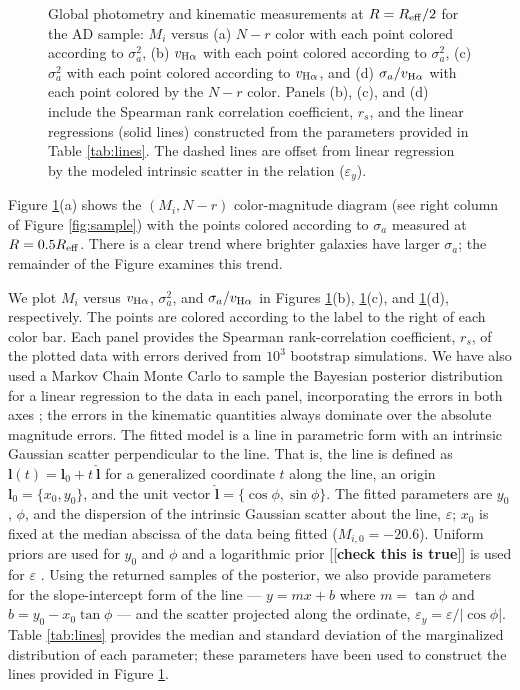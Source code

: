 \documentclass[apj,iop,revtex4,numberedappendix]{emulateapj}
\newcommand{\comment}[2][todo]{{\color{#1}[[{\bf #2}]]}}
\begin{document}
\begin{figure}
\begin{center}
%
\end{center}
%
\caption{
%
Global photometry and kinematic measurements at $R=R_{\rm eff}/2$ for
the AD sample: $M_i$ versus (a) $N-r$ color with each point colored
according to $\sigma_a^2$, (b) $v_{{\rm H}\alpha}$ with each point
colored according to $\sigma_a^2$, (c) $\sigma_a^2$ with each point
colored according to $v_{{\rm H}\alpha}$, and (d) $\sigma_a/v_{{\rm
H}\alpha}$ with each point colored by the $N-r$ color.  Panels (b), (c),
and (d) include the Spearman rank correlation coefficient, $r_s$, and
the linear regressions (solid lines) constructed from the parameters
provided in Table \ref{tab:lines}.  The dashed lines are offset from
linear regression by the modeled intrinsic scatter in the relation
($\varepsilon_y$).
%
}
%
\label{fig:correlation}
%
\end{figure}

Figure \ref{fig:correlation}(a) shows the $(M_i, N-r)$ color-magnitude
diagram (see right column of Figure \ref{fig:sample}) with the points
colored according to $\sigma_a$ measured at $R=0.5R_{\rm eff}$.  There
is a clear trend where brighter galaxies have larger $\sigma_a$; the
remainder of the Figure examines this trend.

We plot $M_i$ versus $v_{{\rm H}\alpha}$, $\sigma_a^2$, and
$\sigma_a/v_{{\rm H}\alpha}$ in Figures \ref{fig:correlation}(b),
\ref{fig:correlation}(c), and \ref{fig:correlation}(d), respectively.
The points are colored according to the label to the right of each color
bar.  Each panel provides the Spearman rank-correlation coefficient,
$r_s$, of the plotted data with errors derived from $10^3$ bootstrap
simulations.  We have also used a Markov Chain Monte Carlo to sample the
Bayesian posterior distribution for a linear regression to the data in
each panel, incorporating the errors in both axes \citep[see,
e.g.][]{2010arXiv1008.4686H}; the errors in the kinematic quantities
always dominate over the absolute magnitude errors.  The fitted model is
a line in parametric form with an intrinsic Gaussian scatter
perpendicular to the line.  That is, the line is defined as
$\mathbf{l}(t) = \mathbf{l}_0 + t\ \hat{\mathbf{l}}$ for a generalized
coordinate $t$ along the line, an origin $\mathbf{l}_0 = \{x_0, y_0\}$,
and the unit vector $\hat{\mathbf{l}} = \{\cos\phi, \sin\phi\}$.  The
fitted parameters are $y_0$, $\phi$, and the dispersion of the intrinsic
Gaussian scatter about the line, $\varepsilon$; $x_0$ is fixed at the
median abscissa of the data being fitted ($M_{i,0} = -20.6$).  Uniform
priors are used for $y_0$ and $\phi$ and a logarithmic prior
\comment{check this is true} is used for $\varepsilon$
\citep{MacKay:itp}.  Using the returned samples of the posterior, we
also provide parameters for the slope-intercept form of the line --- $y
= mx + b$ where $m = \tan\phi$ and $b = y_0 - x_0 \tan\phi$ --- and the
scatter projected along the ordinate, $\varepsilon_y =
\varepsilon/|\cos\phi$|.  Table \ref{tab:lines} provides the median and
standard deviation of the marginalized distribution of each parameter;
these parameters have been used to construct the lines provided in
Figure \ref{fig:correlation}.
\end{document}
